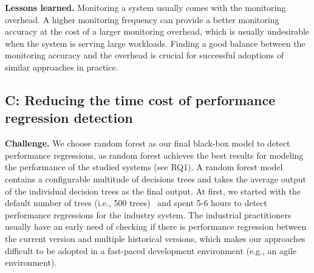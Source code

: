 \noindent\textbf{Lessons learned.}
Monitoring a system usually comes with the monitoring overhead.
A higher monitoring frequency can provide a better monitoring accuracy at the cost of a larger monitoring overhead, which is usually undesirable when the system is serving large workloads.
Finding a good balance between the monitoring accuracy and the overhead is crucial for successful adoptions of similar approaches in practice.


\subsection*{C: Reducing the time cost of performance regression detection}
\noindent\textbf{Challenge.}
We choose random forest as our final black-box model to detect performance regressions, as random forest achieves the best results for modeling the performance of the studied systems (see RQ1).
A random forest model contains a configurable multitude of decisions trees and takes the average output of the individual decision trees as the final output.
At first, we started with the default number of trees (i.e., 500 trees)~\citep{R-RandomForest} and spent 5-6 hours to detect performance regressions for the industry system. 
The industrial practitioners usually have an early need of checking if there is performance regression between the current version and multiple historical versions, which makes our approaches difficult to be adopted in a fast-paced development environment (e.g., an agile environment).

